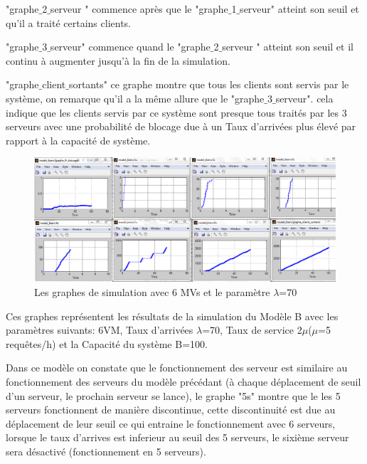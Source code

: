 "graphe$\_$2$\_$serveur " commence après que le "graphe$\_$1$\_$serveur" atteint son seuil et qu'il a traité certains clients.

"graphe$\_$3$\_$serveur" commence quand le "graphe$\_$2$\_$serveur " atteint son seuil et  il continu à augmenter jusqu'à la fin de la simulation.

"graphe$\_$client$\_$sortants" ce graphe montre que tous les clients sont servis par le système, on remarque qu'il a la même allure que le "graphe$\_$3$\_$serveur". cela indique que les clients servis par ce système sont presque tous traités par les 3 serveurs  avec une probabilité de blocage due à un Taux d’arrivées plus élevé par rapport à la capacité de système.
\\
\newpage
\begin{figure}[ht!]
\centering
\includegraphics[width=0.95 \textwidth]{photo/graphe_6MV.png}
\caption{Les graphes de simulation avec 6 MVs et le paramètre $\lambda$=70}
\label{fig:graphe2}
\end{figure}
\noindent Ces graphes représentent les résultats de la simulation du Modèle B avec les paramètres suivants: 6VM, Taux d’arrivées  $\lambda$=70, Taux de service  2$\mu$($\mu$=5 requêtes/h) et la Capacité du système B=100.

\noindent Dans ce modèle on constate que le fonctionnement des serveur est similaire au fonctionnement des serveurs du modèle précédant (à chaque déplacement de seuil d'un serveur, le prochain  serveur se lance), le graphe "5s" montre que le les 5 serveurs fonctionnent de manière discontinue, cette discontinuité est due au déplacement de leur seuil ce qui entraine le fonctionnement avec 6 serveurs, lorsque le taux d'arrives est inferieur au seuil des 5 serveurs, le sixième serveur sera désactivé (fonctionnement en 5 serveurs).   

